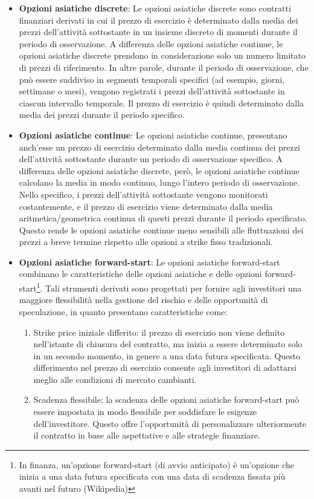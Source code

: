 \documentclass[12pt,a4paper]{report}
\begin{document}
\begin{itemize}
    \item \textbf{Opzioni asiatiche discrete}: Le opzioni asiatiche discrete sono contratti finanziari derivati in cui il prezzo di esercizio è determinato dalla media dei prezzi dell'attività sottostante in un insieme discreto di momenti durante il periodo di osservazione. A differenza delle opzioni asiatiche continue, le opzioni asiatiche discrete prendono in considerazione solo un numero limitato di prezzi di riferimento. In altre parole, durante il periodo di osservazione, che può essere suddiviso in segmenti temporali specifici (ad esempio, giorni, settimane o mesi), vengono registrati i prezzi dell'attività sottostante in ciascun intervallo temporale. Il prezzo di esercizio è quindi determinato dalla media dei prezzi durante il periodo specifico.
    
    \item \textbf{Opzioni asiatiche continue}: Le opzioni asiatiche continue, presentano anch'esse un prezzo di esercizio determinato dalla media continua dei prezzi dell'attività sottostante durante un periodo di osservazione specifico. A differenza delle opzioni asiatiche discrete, però, le opzioni asiatiche continue calcolano la media in modo continuo, lungo l'intero periodo di osservazione. Nello specifico, i prezzi dell'attività sottostante vengono monitorati costantemente, e il prezzo di esercizio viene determinato dalla media aritmetica/geometrica continua di questi prezzi durante il periodo specificato. Questo rende le opzioni asiatiche continue meno sensibili alle fluttuazioni dei prezzi a breve termine rispetto alle opzioni a strike fisso tradizionali.
    
    \item \textbf{Opzioni asiatiche forward-start}: Le opzioni asiatiche forward-start combinano le caratteristiche delle opzioni asiatiche e delle opzioni forward-start\footnote{In finanza, un'opzione forward-start (di avvio anticipato) è un'opzione che inizia a una data futura specificata con una data di scadenza fissata più avanti nel futuro (Wikipedia)}. Tali strumenti derivati sono progettati per fornire agli investitori una maggiore flessibilità nella gestione del rischio e delle opportunità di speculazione, in quanto presentano caratteristiche come:

    \begin{enumerate}
        \item Strike price iniziale differito: il prezzo di esercizio non viene definito nell'istante di chiusura del contratto, ma inizia a essere determinato solo in un secondo momento, in genere a una data futura specificata. Questo differimento nel prezzo di esercizio consente agli investitori di adattarsi meglio alle condizioni di mercato cambianti.
        \item Scadenza flessibile: la scadenza delle opzioni asiatiche forward-start può essere impostata in modo flessibile per soddisfare le esigenze dell'investitore. Questo offre l'opportunità di personalizzare ulteriormente il contratto in base alle aspettative e alle strategie finanziare.
    \end{enumerate}

\end{itemize}
\end{document}
